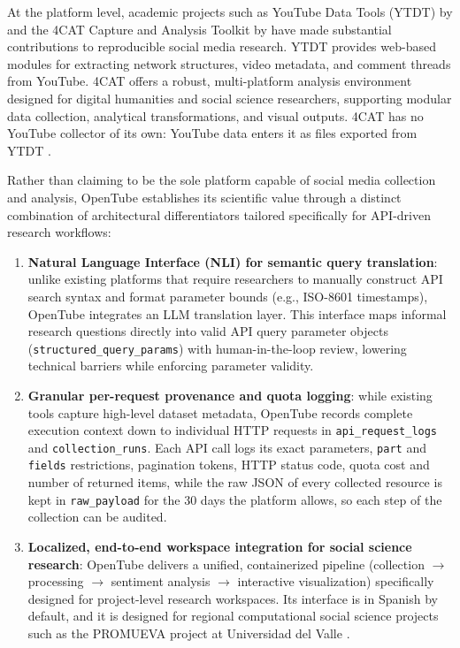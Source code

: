 At the platform level, academic projects such as YouTube Data Tools (YTDT) by \textcite{youtube_data_tools} and the 4CAT Capture and Analysis Toolkit by \textcite{peeters20224cat} have made substantial contributions to reproducible social media research. YTDT provides web-based modules for extracting network structures, video metadata, and comment threads from YouTube. 4CAT offers a robust, multi-platform analysis environment designed for digital humanities and social science researchers, supporting modular data collection, analytical transformations, and visual outputs. 4CAT has no YouTube collector of its own: YouTube data enters it as files exported from YTDT \autocite{fourcat_datasources}.

Rather than claiming to be the sole platform capable of social media collection and analysis, OpenTube establishes its scientific value through a distinct combination of architectural differentiators tailored specifically for API-driven research workflows:

\begin{enumerate}
    \item \textbf{Natural Language Interface (NLI) for semantic query translation}: unlike existing platforms that require researchers to manually construct API search syntax and format parameter bounds (e.g., ISO-8601 timestamps), OpenTube integrates an LLM translation layer. This interface maps informal research questions directly into valid API query parameter objects (\texttt{structured\_query\_params}) with human-in-the-loop review, lowering technical barriers while enforcing parameter validity.

    \item \textbf{Granular per-request provenance and quota logging}: while existing tools capture high-level dataset metadata, OpenTube records complete execution context down to individual HTTP requests in \texttt{api\_request\_logs} and \texttt{collection\_runs}. Each API call logs its exact parameters, \texttt{part} and \texttt{fields} restrictions, pagination tokens, HTTP status code, quota cost and number of returned items, while the raw JSON of every collected resource is kept in \texttt{raw\_payload} for the 30 days the platform allows, so each step of the collection can be audited.

    \item \textbf{Localized, end-to-end workspace integration for social science research}: OpenTube delivers a unified, containerized pipeline (collection $\rightarrow$ processing $\rightarrow$ sentiment analysis $\rightarrow$ interactive visualization) specifically designed for project-level research workspaces. Its interface is in Spanish by default, and it is designed for regional computational social science projects such as the PROMUEVA project at Universidad del Valle \autocite{promueva_project}.
\end{enumerate}

